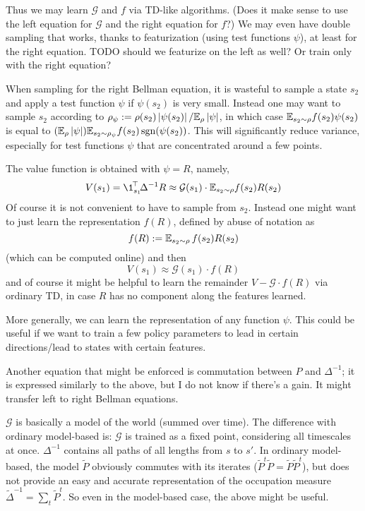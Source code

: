 \documentclass[11pt,a4paper]{article}
\newcommand{\green}{\mathcal{G}}
\DeclareMathOperator{\sgn}{sgn}
\begin{document}
Thus we may learn $\green$ and $f$ via TD-like algorithms. (Does it make
sense to use the left equation for $\green$ and the right equation for
$f$?) We may even have
double sampling that works, thanks to featurization (using test functions
$\psi$), at least for the right equation. TODO should we featurize on the
left as well? Or train only with the right equation?

When sampling for the right Bellman equation, it is wasteful to sample a
state $s_2$ and apply a test function $\psi$ if $\psi(s_2)$ is very
small. Instead one may want to sample $s_2$ according to
$\rho_\psi\mathrel{\mathop{:}}= \rho(s_2)\left\lvert\psi(s_2)\right\rvert/\mathbb{E}_{\rho}\left\lvert\psi\right\rvert$, in which case
$\mathbb{E}_{s_2\sim \rho} f(s_2)\psi(s_2)$ is equal to $(\E_{\rho}\abs{\psi})\E_{s_2\sim \rho_\psi}
f(s_2)\sgn(\psi(s_2))$. This will significantly reduce variance,
especially for test functions $\psi$ that are concentrated around a few
points.

The value function is obtained with $\psi=R$, namely,
\begin{equation}
V(s_1)=\transp{\1_{s_1}}\Delta^{-1}R\approx
\green(s_1)\cdot\E_{s_2\sim \rho}
f(s_2)R(s_2)
\end{equation}
Of course it is not convenient to have to sample from $s_2$. Instead one
might want to just learn the representation $f(R)$, defined by abuse of
notation as
\begin{equation}
f(R)\mathrel{\mathop{:}}= \mathbb{E}_{s_2\sim \rho} \,f(s_2)R(s_2)
\end{equation}
(which can be computed online)
and then
\begin{equation}
V(s_1)\approx \green(s_1)\cdot f(R)
\end{equation}
and of course it might be helpful to learn the remainder $V-\green\cdot
f(R)$ via ordinary TD, in case $R$ has no component along the features
learned.

More generally, we can learn the representation of any function $\psi$.
This could be useful if we want to train a few policy parameters to lead in
certain directions/lead to states with certain features.

Another equation that might be enforced is commutation between
$P$ and $\Delta^{-1}$; it is expressed similarly to the above, but I do
not know if there's a gain. It might transfer left to right Bellman
equations.

$\green$ is basically a model of the world (summed over time). The
difference with ordinary model-based is: $\green$ is trained as a fixed
point, considering all timescales at once. $\Delta^{-1}$ contains all
paths of all lengths from $s$ to $s'$. In ordinary model-based, the
model $\tilde P$ obviously commutes with its iterates ($\tilde P^t\tilde
P=\tilde P\tilde P^t$), but does not provide an easy and accurate
representation of the occupation measure $\tilde \Delta^{-1}=\sum_t \tilde P^t$. So even in
the model-based case, the above might be useful.
\end{document}
